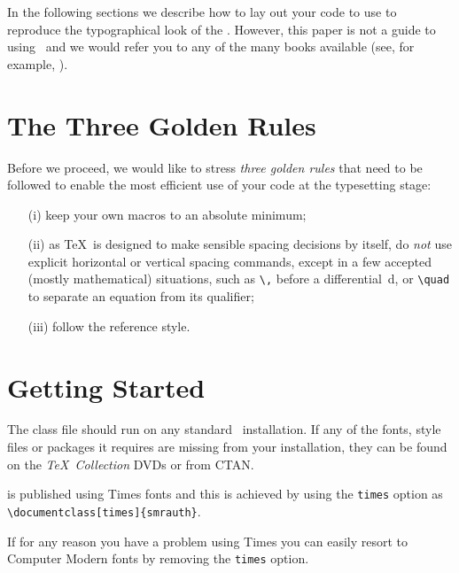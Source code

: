 \documentclass[times]{smrauth}
\begin{document}
In the following sections we describe how to lay out your code to
use \textsf{\journalclass} to reproduce the typographical look of
the \emph{\journalnamelc}. However, this paper is not a guide to
using \LaTeXe\ and we would refer you to any of the many books
available (see, for example, \cite{R1,R2,R3}).

\section{The Three Golden Rules}

Before we proceed, we would like to stress \emph{three golden
rules} that need to be followed to enable the most efficient use
of your code at the typesetting stage:

\pagebreak

\begin{enumerate}
\item[(i)] keep your own macros to an absolute minimum;

\item[(ii)] as \TeX\ is designed to make sensible spacing
decisions by itself, do \emph{not} use explicit horizontal or
vertical spacing commands, except in a few accepted (mostly
mathematical) situations, such as \verb"\," before a
differential~d, or \verb"\quad" to separate an equation from its
qualifier;

\item[(iii)] follow the \emph{\journalnamelc} reference style.
\end{enumerate}

\section{Getting Started} The \textsf{\journalclassshort} class file should run
on any standard \LaTeXe\ installation. If any of the fonts, style
files or packages it requires are missing from your installation,
they can be found on the \emph{\TeX\ Collection} DVDs or from
CTAN.

\emph{\journalnamelc} is published using Times fonts and this is
achieved by using the \verb"times"
option as\\
\verb"\documentclass[times]{smrauth}".

\noindent If for any reason you have a problem using Times you can
easily resort to Computer Modern fonts by removing the
\verb"times" option.
\end{document}
